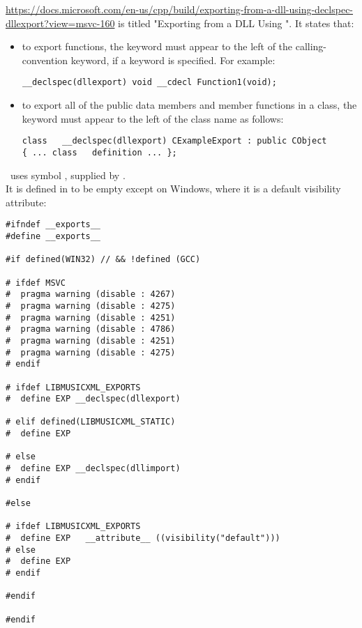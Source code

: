 \url{https://docs.microsoft.com/en-us/cpp/build/exporting-from-a-dll-using-declspec-dllexport?view=msvc-160} is titled "Exporting from a DLL Using ". It states that:
\begin{itemize}
\item to export functions, the  keyword must appear to the left of the calling-convention keyword, if a keyword is specified. For example:
\begin{lstlisting}[language=CPlusPlus]
__declspec(dllexport) void __cdecl Function1(void);
\end{lstlisting}

\item to export all of the public data members and member functions in a class, the keyword must appear to the left of the class   name as follows:
\begin{lstlisting}[language=CPlusPlus]
class   __declspec(dllexport) CExampleExport : public CObject
{ ... class   definition ... };
\end{lstlisting}

\end{itemize}

\mf\ uses symbol , supplied by \libmusicxmlsamples. \\
It is defined in  to be empty except on Windows, where it is a default visibility attribute:
\begin{lstlisting}[language=CPlusPlus]
#ifndef __exports__
#define __exports__

#if defined(WIN32) // && !defined (GCC)

# ifdef MSVC
#  pragma warning (disable : 4267)
#  pragma warning (disable : 4275)
#  pragma warning (disable : 4251)
#  pragma warning (disable : 4786)
#  pragma warning (disable : 4251)
#  pragma warning (disable : 4275)
# endif

# ifdef LIBMUSICXML_EXPORTS
#  define EXP __declspec(dllexport)

# elif defined(LIBMUSICXML_STATIC)
#  define EXP

# else
#  define EXP __declspec(dllimport)
# endif

#else

# ifdef LIBMUSICXML_EXPORTS
#  define EXP	__attribute__ ((visibility("default")))
# else
#  define EXP
# endif

#endif

#endif
\end{lstlisting}


